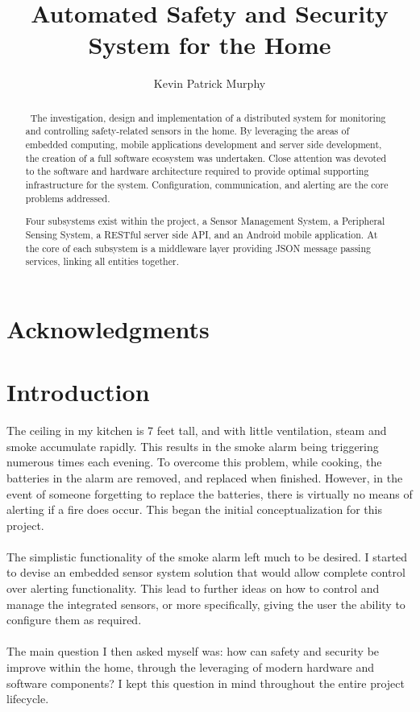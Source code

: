 \documentclass{article}
\begin{document}
\title{Automated Safety and Security System for the Home}

\author{Kevin Patrick Murphy}

\maketitle

\begin{abstract}

{\ The investigation, design and implementation of a distributed system for monitoring and controlling safety-related sensors in the home. By leveraging the areas of embedded computing, mobile applications development and server side development, the creation of a full software ecosystem was undertaken. Close attention was devoted to the software and hardware architecture required to provide optimal supporting infrastructure for the system. Configuration, communication, and alerting are the core problems addressed.

Four subsystems exist within the project, a Sensor Management System, a Peripheral Sensing System, a RESTful server side API, and an Android mobile application. At the core of each subsystem is a middleware layer providing JSON message passing services, linking all entities together. }

\end{abstract}

\newpage

\tableofcontents

\newpage

\section*{Acknowledgments}

\section{Introduction}
The ceiling in my kitchen is 7 feet tall, and with little ventilation, steam and smoke accumulate rapidly. This results in the smoke alarm being triggering numerous times each evening. To overcome this problem, while cooking, the batteries in the alarm are removed, and replaced when finished. However, in the event of someone forgetting to replace the batteries, there is virtually no means of alerting if a fire does occur. This began the initial conceptualization for this project. \\\\
The simplistic functionality of the smoke alarm left much to be desired. I started to devise an embedded sensor system solution that would allow complete control over alerting functionality. This lead to further ideas on how to control and manage the integrated sensors, or more specifically, giving the user the ability to configure them as required. \\\\
The main question I then asked myself was: how can safety and security be improve within the home, through the leveraging of modern hardware and software components? I kept this question in mind throughout the entire project lifecycle.
\end{document}
